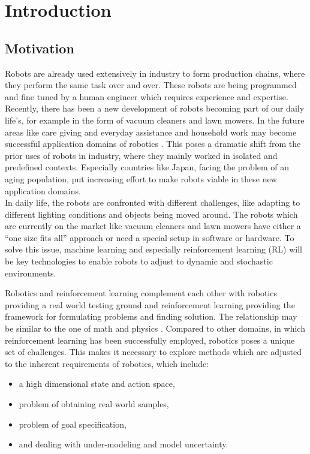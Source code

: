 
\chapter{Introduction}

\section{Motivation}
Robots are already used extensively in industry to form production chains,
where they perform the same task over and over.
These robots are being programmed and fine tuned
by a human engineer which requires experience and expertise. \\
Recently, there has been a new development of robots
becoming part of our daily life's, for example in the form of 
vacuum cleaners and lawn mowers. In the future areas like care giving and
everyday assistance and household work may become successful
application domains
of robotics \citep{schaal2007new}.
This poses a dramatic shift from the prior uses of robots in industry, where
they mainly worked in isolated and predefined contexts.
Especially countries like Japan, facing the problem of an
aging population, put increasing effort to make robots
viable in these new application domains.  \\
In daily life, the robots are confronted with different challenges,
like adapting to different lighting conditions and
objects being moved around.
The robots which are currently on the market
like vacuum cleaners and lawn mowers have
either a ``one size fits all'' approach or need a special setup
in software or hardware. To solve this issue,
machine learning and especially
reinforcement learning (RL) will be key technologies to enable robots
to adjust to dynamic and stochastic environments.

Robotics and reinforcement learning complement each other
with robotics providing a real world testing ground and
reinforcement learning providing
the framework for formulating problems and finding solution. The 
relationship may be similar to the one of  math and physics
\citep{kober2013reinforcement}. 
Compared to other domains, in which reinforcement learning has been
successfully employed,
robotics poses a unique set of challenges. This makes
it necessary to explore methods which are adjusted to the inherent
requirements of robotics, which include:

\begin{itemize}
\item a high dimensional state and action space,
\item problem of obtaining real world samples,
\item problem of goal specification,
\item and dealing with under-modeling and model uncertainty.
\end{itemize}

